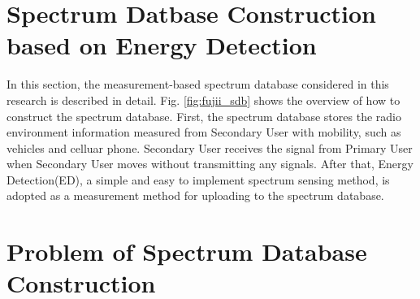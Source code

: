 \section{Spectrum Datbase Construction based on Energy Detection}
In this section, the measurement-based spectrum database considered in this research is described in detail. Fig. \ref{fig:fujii_sdb} shows the overview of how to construct the spectrum database. First, the spectrum database stores the radio environment information measured from Secondary User with mobility, such as vehicles and celluar phone. Secondary User receives the signal from Primary User when Secondary User moves without transmitting any signals. After that, Energy Detection(ED)\cite{ref:ED}, a simple and easy to implement spectrum sensing method, is adopted as a measurement method for uploading to the spectrum database.  


\section{Problem of Spectrum Database Construction }


